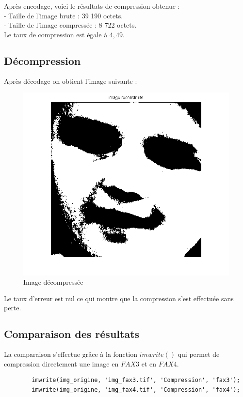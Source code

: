 \documentclass[11pt]{article}
\begin{document}
	Après encodage, voici le résultats de compression obtenue :\\
		- Taille de l'image brute : 39 190 octets.\\
		- Taille de l'image compressée : 8 722 octets.\\
	Le taux de compression est égale à $4,49$.
	
	\subsection{Décompression}
	
	Après décodage on obtient l'image suivante :

		\begin{figure}[H]
			\centering
			\includegraphics[scale=0.6]{img/img_dec.png}
			\caption{Image décompressée}
			\label{img2}
		\end{figure}
		
		Le taux d'erreur est nul ce qui montre que la compression s'est effectuée sans perte.
	
	\subsection{Comparaison des résultats}
	
	La comparaison s'effectue grâce à la fonction $imwrite()$ qui permet de compression directement une image en $FAX3$ et en $FAX4$.
	
	\begin{lstlisting}
		imwrite(img_origine, 'img_fax3.tif', 'Compression', 'fax3');
		imwrite(img_origine, 'img_fax4.tif', 'Compression', 'fax4');
	\end{lstlisting}
	
\end{document}
